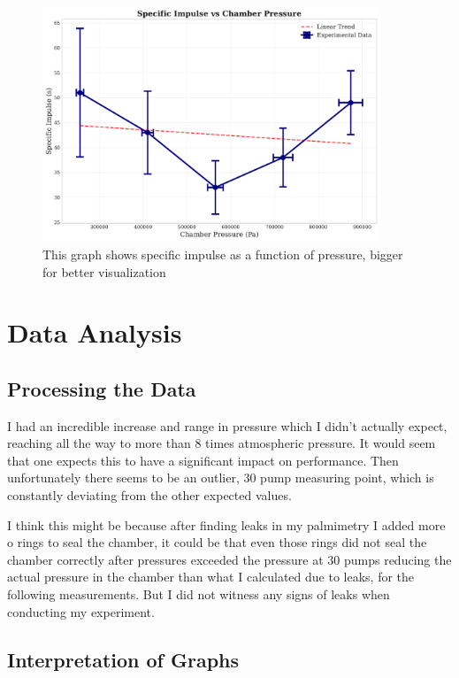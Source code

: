 \documentclass[12pt,a4paper]{article}
\begin{document}
\begin{figure}[H]
\centering
\includegraphics[width=0.9\textwidth]{specific_impulse_vs_pressure.pdf}
\caption{This graph shows specific impulse as a function of pressure, bigger for better visualization}
\label{fig:specific_impulse_pressure}
\end{figure}

\section{Data Analysis}

\subsection{Processing the Data}

I had an incredible increase and range in pressure which I didn't actually expect, reaching all the way to more than 8 times atmospheric pressure. It would seem that one expects this to have a significant impact on performance. Then unfortunately there seems to be an outlier, 30 pump measuring point, which is constantly deviating from the other expected values.

I think this might be because after finding leaks in my palmimetry I added more o rings to seal the chamber, it could be that even those rings did not seal the chamber correctly after pressures exceeded the pressure at 30 pumps reducing the actual pressure in the chamber than what I calculated due to leaks, for the following measurements. But I did not witness any signs of leaks when conducting my experiment.

\subsection{Interpretation of Graphs}
\end{document}
